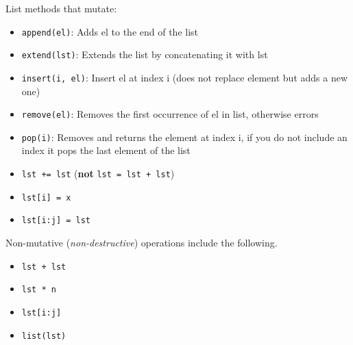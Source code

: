 \newpage
List methods that mutate:
\begin{itemize}
\item \lstinline{append(el)}: Adds el to the end of the list
\item \lstinline{extend(lst)}: Extends the list by concatenating it with lst
\item \lstinline{insert(i, el)}: Insert el at index i (does not replace element but adds a new one)
\item \lstinline{remove(el)}: Removes the first occurrence of el in list, otherwise errors
\item \lstinline{pop(i)}: Removes and returns the element at index i, if you do not include an index it pops the last element of the list
\item \lstinline$lst += lst$ (\textbf{not} \lstinline$lst = lst + lst$)
\item \lstinline$lst[i] = x$
\item \lstinline$lst[i:j] = lst$
\end{itemize}

\vspace{\parskip}

\begin{blocksection}
Non-mutative (\emph{non-destructive}) operations include the following.

\begin{itemize}
\item \lstinline$lst + lst$
\item \lstinline$lst * n$
\item \lstinline$lst[i:j]$
\item \lstinline$list(lst)$
\end{itemize}
\end{blocksection}

\vspace{\parskip}
